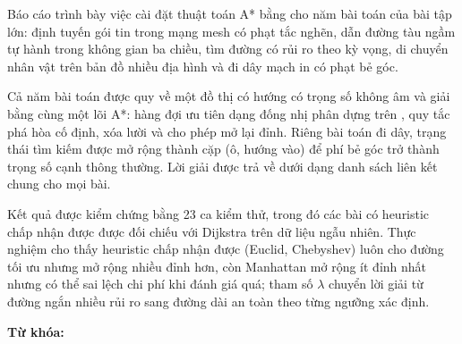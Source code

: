 
Báo cáo trình bày việc cài đặt thuật toán A* bằng \Cpp{} cho năm bài toán của bài tập lớn:
định tuyến gói tin trong mạng mesh có phạt tắc nghẽn, dẫn đường tàu ngầm tự hành trong không
gian ba chiều, tìm đường có rủi ro theo kỳ vọng, di chuyển nhân vật trên bản đồ nhiều địa
hình và đi dây mạch in có phạt bẻ góc.

Cả năm bài toán được quy về một đồ thị có hướng có trọng số không âm và giải bằng cùng một lõi
A*: hàng đợi ưu tiên dạng đống nhị phân dựng trên , quy tắc phá hòa cố
định, xóa lười và cho phép mở lại đỉnh. Riêng bài toán đi dây, trạng thái tìm kiếm được mở
rộng thành cặp (ô, hướng vào) để phí bẻ góc trở thành trọng số cạnh thông thường. Lời giải được
trả về dưới dạng danh sách liên kết  chung cho mọi bài.

Kết quả được kiểm chứng bằng 23 ca kiểm thử, trong đó các bài có heuristic chấp nhận được được
đối chiếu với Dijkstra trên dữ liệu ngẫu nhiên. Thực nghiệm cho thấy heuristic chấp nhận
được (Euclid, Chebyshev) luôn cho đường tối ưu nhưng mở rộng nhiều đỉnh hơn, còn Manhattan mở
rộng ít đỉnh nhất nhưng có thể sai lệch chi phí khi đánh giá quá; tham số $\lambda$ chuyển
lời giải từ đường ngắn nhiều rủi ro sang đường dài an toàn theo từng ngưỡng xác định.

\vspace{0.6em}
\noindent\textbf{Từ khóa:} \textit{\TuKhoa}
